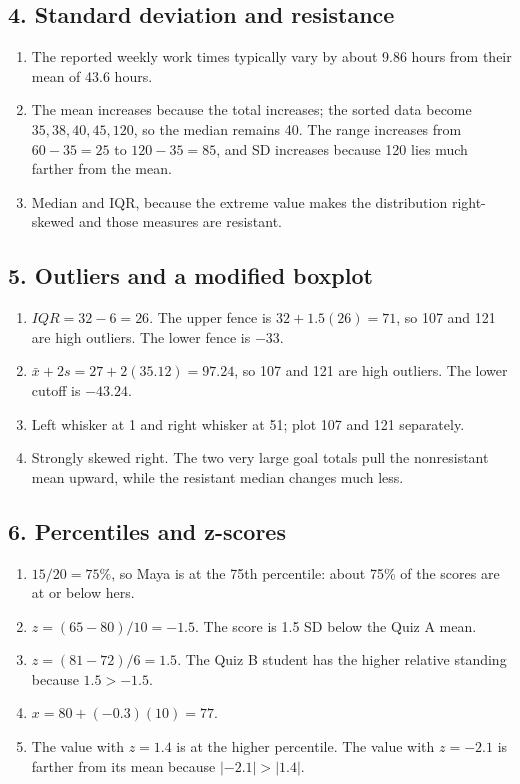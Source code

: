 \documentclass[11pt]{article}
\newcommand{\ans}[1]{\textcolor{AnswerBlue}{#1}}
\begin{document}
\subsection*{4. Standard deviation and resistance}
\begin{answerbox}
\begin{enumerate}[label=\alph*.]
  \item \ans{The reported weekly work times typically vary by about 9.86 hours from their mean of 43.6 hours.}
  \item \ans{The mean increases because the total increases; the sorted data become $35,38,40,45,120$, so the median remains 40. The range increases from $60-35=25$ to $120-35=85$, and SD increases because 120 lies much farther from the mean.}
  \item \ans{Median and IQR, because the extreme value makes the distribution right-skewed and those measures are resistant.}
\end{enumerate}
\end{answerbox}

\subsection*{5. Outliers and a modified boxplot}
\begin{answerbox}
\begin{enumerate}[label=\alph*.]
  \item \ans{$IQR=32-6=26$. The upper fence is $32+1.5(26)=71$, so 107 and 121 are high outliers. The lower fence is $-33$.}
  \item \ans{$\bar{x}+2s=27+2(35.12)=97.24$, so 107 and 121 are high outliers. The lower cutoff is $-43.24$.}
  \item \ans{Left whisker at 1 and right whisker at 51; plot 107 and 121 separately.}
  \item \ans{Strongly skewed right. The two very large goal totals pull the nonresistant mean upward, while the resistant median changes much less.}
\end{enumerate}
\end{answerbox}

\subsection*{6. Percentiles and z-scores}
\begin{answerbox}
\begin{enumerate}[label=\alph*.]
  \item \ans{$15/20=75\%$, so Maya is at the 75th percentile: about 75\% of the scores are at or below hers.}
  \item \ans{$z=(65-80)/10=-1.5$. The score is 1.5 SD below the Quiz A mean.}
  \item \ans{$z=(81-72)/6=1.5$. The Quiz B student has the higher relative standing because $1.5>-1.5$.}
  \item \ans{$x=80+(-0.3)(10)=77$.}
  \item \ans{The value with $z=1.4$ is at the higher percentile. The value with $z=-2.1$ is farther from its mean because $|-2.1|>|1.4|$.}
\end{enumerate}
\end{answerbox}
\end{document}
